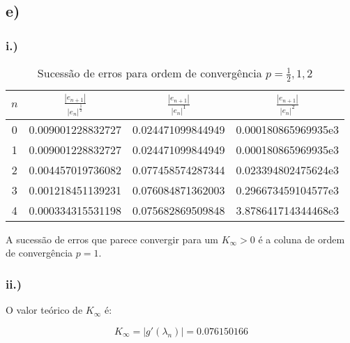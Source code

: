 \documentclass[a4paper, 18pt]{article}
\begin{document}
\subsection*{e)}
	\subsubsection*{i.)}


	\begin{table}[H]
		\setlength{\tabcolsep}{0.5cm} %
		\renewcommand{\arraystretch}{1.5} %
		\centering
		\caption{Sucessão de erros para ordem de convergência $p = \frac{1}{2}, 1, 2$}
		\label{2e_table}
		\begin{tabular}{|c|c|c|c}
			$n$ & $\frac{|e_{n+1}|}{|e_n|^{\frac{1}{2}}}$ &  $\frac{|e_{n+1}|}{|e_n|^1}$ & $\frac{|e_{n+1}|}{|e_n|^2}$ \\\hline
			0 & 0.009001228832727 & 0.024471099844949 & 0.000180865969935e3 \\
			1 & 0.009001228832727 & 0.024471099844949 & 0.000180865969935e3 \\
			2 & 0.004457019736082 & 0.077458574287344 & 0.023394802475624e3 \\
			3 & 0.001218451139231 & 0.076084871362003 & 0.296673459104577e3 \\
			4 & 0.000334315531198 & 0.075682869509848 & 3.878641714344468e3 \\
		\end{tabular}
	\end{table}

	\par
	A sucessão de erros que parece convergir para um $K_\infty > 0$ é a coluna de ordem de convergência $p = 1$.


\subsubsection*{ii.)}
	\par
	O valor teórico de $K_\infty$ é:

	$$K_\infty = |g'(\lambda_n)| = 0.076150166$$
\end{document}
